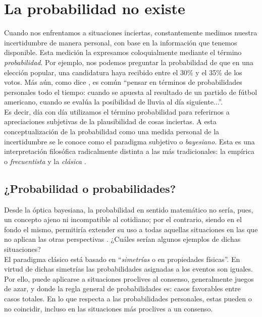 \chapter{La probabilidad no existe}
	
Cuando nos enfrentamos a situaciones inciertas, constantemente medimos nuestra incertidumbre de manera personal, con base en la información que tenemos disponible. Esta medición la expresamos coloquialmente mediante el término \textit{probabilidad}. Por ejemplo, nos podemos preguntar la probabilidad de que en una elección popular, una candidatura haya recibido entre el 30\% y el 35\% de los votos. Más aún, como dice \textcite{Berger85}, es común ``pensar en términos de probabilidades personales todo el tiempo: cuando se apuesta al resultado de un partido de fútbol americano, cuando se evalúa la posibilidad de lluvia al día siguiente...''.\\ 

Es decir, día con día utilizamos el término probabilidad para referirnos a apreciaciones subjetivas de la plausibilidad de cosas inciertas. A esta conceptualización de la probabilidad como una medida personal de la incertidumbre se le conoce como el paradigma subjetivo o \textit{bayesiano}. Esta es una interpretación filosófica radicalmente distinta a las más tradicionales: la empírica o \textit{frecuentista} y la \textit{clásica} \parencite{Nozer17,GP16}. 
	
\section{¿Probabilidad o probabilidades?}

Desde la óptica bayesiana, la probabilidad en sentido matemático no sería, pues, un concepto ajeno ni incompatible al cotidiano; por el contrario, siendo en el fondo el mismo, permitiría extender su uso a todas aquellas situaciones en las que no aplican las otras perspectivas \parencite{Berger85,GP16}. ¿Cuáles serían algunos ejemplos de dichas situaciones?\\
	
El paradigma clásico está basado en ``\textit{simetrías} o en propiedades físicas''\parencite{GP16}. En virtud de dichas simetrías las probabilidades asignadas a los eventos son iguales. Por ello, puede aplicarse a situaciones proclives al consenso, generalmente juegos de azar, y donde la regla general de probabilidades es: casos favorables entre casos totales. En lo que respecta a las probabilidades personales, estas pueden o no coincidir, incluso en las situaciones más proclives a un consenso.\\ 
	

